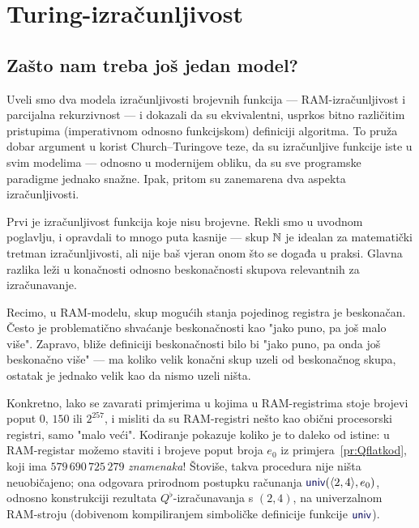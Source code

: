 \chapter{Turing-izračunljivost}\label{ch:Turing}

\section{Zašto nam treba još jedan model?}

Uveli smo dva modela izračunljivosti brojevnih funkcija --- RAM-izračunljivost i parcijalna rekurzivnost --- i dokazali da su ekvivalentni, usprkos bitno različitim pristupima (imperativnom odnosno funkcijskom) definiciji algoritma. To pruža dobar argument u korist Church--\!Turingove teze, da su izračunljive funkcije iste u svim modelima --- odnosno u modernijem obliku, da su sve programske paradigme jednako snažne. Ipak, pritom su zanemarena dva aspekta izračunljivosti.


Prvi je izračunljivost funkcija koje nisu brojevne. Rekli smo u uvodnom poglavlju, i opravdali to mnogo puta kasnije --- skup ${\mathbb N}$ je idealan za matematički tretman izračunljivosti, ali nije baš vjeran onom što se događa u praksi. Glavna razlika leži u konačnosti odnosno beskonačnosti skupova relevantnih za izračunavanje.

Recimo, u RAM-modelu, skup mogućih stanja pojedinog registra je beskonačan. Često je problematično shvaćanje beskonačnosti kao "jako puno, pa još malo više". Zapravo, bliže definiciji beskonačnosti bilo bi "jako puno, pa onda još beskonačno više" --- ma koliko velik konačni skup uzeli od beskonačnog skupa, ostatak je jednako velik kao da nismo uzeli ništa.

Konkretno, lako se zavarati primjerima u kojima u RAM-registrima stoje brojevi poput $0$, $150$ ili $2^{257}$, i misliti da su RAM-registri nešto kao obični procesorski registri, samo "malo veći". Kodiranje pokazuje koliko je to daleko od istine: u RAM-registar možemo staviti i brojeve poput broja $e_0$ iz primjera~\ref{pr:Qflatkod}, koji ima $579\,690\,725\,279$ \emph{znamenaka}! Štoviše, takva procedura nije ništa neuobičajeno; ona odgovara prirodnom postupku računanja $\f{univ}(\kr{2,4},e_0)$, odnosno konstrukciji rezultata $Q^\flat$-izračunavanja s $(2,4)$, na univerzalnom RAM-stroju (dobivenom kompiliranjem simboličke definicije funkcije $\f{univ}$).

